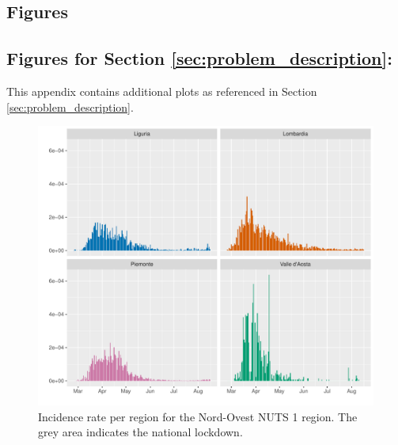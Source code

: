 \documentclass[12pt]{article}
\begin{document}
\begin{appendices}
		\newpage
		\section{Figures} \label{app:figures}
		
		\subsection{Figures for Section \ref{sec:problem_description}: } \label{sapp:figures_problem_description}
		This appendix contains additional plots as referenced in Section \ref{sec:problem_description}.
		
		\begin{figure}[H]
    	    \centering
    	    \includegraphics[width=0.94\linewidth]{output/infective_rates_Nord-Ovest.pdf}
    	    \caption{Incidence rate per region for the Nord-Ovest NUTS 1 region. The grey area indicates the national lockdown.}
    	    \label{fig:incidence_nordovest}
    	\end{figure}
    	

\end{appendices}
\end{document}
